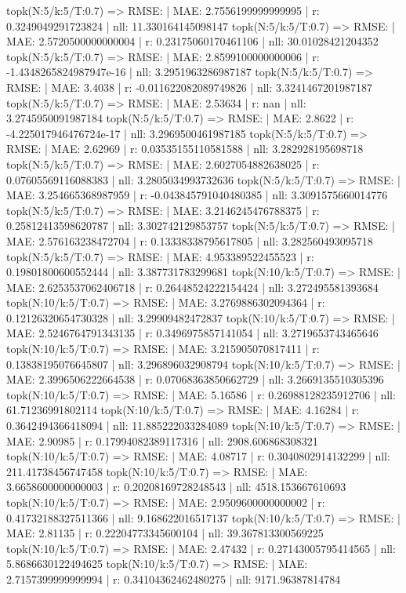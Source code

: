 topk(N:5/k:5/T:0.7) => RMSE: | MAE: 2.7556199999999995 | r: 0.3249049291723824 | nll: 11.330164145098147
topk(N:5/k:5/T:0.7) => RMSE: | MAE: 2.5720500000000004 | r: 0.23175060170461106 | nll: 30.01028421204352
topk(N:5/k:5/T:0.7) => RMSE: | MAE: 2.8599100000000006 | r: -1.4348265824987947e-16 | nll: 3.2951963286987187
topk(N:5/k:5/T:0.7) => RMSE: | MAE: 3.4038 | r: -0.011622082089749826 | nll: 3.3241467201987187
topk(N:5/k:5/T:0.7) => RMSE: | MAE: 2.53634 | r: nan | nll: 3.2745950091987184
topk(N:5/k:5/T:0.7) => RMSE: | MAE: 2.8622 | r: -4.225017946476724e-17 | nll: 3.2969500461987185
topk(N:5/k:5/T:0.7) => RMSE: | MAE: 2.62969 | r: 0.03535155110581588 | nll: 3.282928195698718
topk(N:5/k:5/T:0.7) => RMSE: | MAE: 2.6027054882638025 | r: 0.07605569116088383 | nll: 3.2805034993732636
topk(N:5/k:5/T:0.7) => RMSE: | MAE: 3.254665368987959 | r: -0.043845791040480385 | nll: 3.3091575660014776
topk(N:5/k:5/T:0.7) => RMSE: | MAE: 3.2146245476788375 | r: 0.25812413598620787 | nll: 3.302742129853757
topk(N:5/k:5/T:0.7) => RMSE: | MAE: 2.576163238472704 | r: 0.13338338795617805 | nll: 3.282560493095718
topk(N:5/k:5/T:0.7) => RMSE: | MAE: 4.953389522455523 | r: 0.19801800600552444 | nll: 3.387731783299681
topk(N:10/k:5/T:0.7) => RMSE: | MAE: 2.6253537062406718 | r: 0.26448524222154424 | nll: 3.272495581393684
topk(N:10/k:5/T:0.7) => RMSE: | MAE: 3.2769886302094364 | r: 0.12126320654730328 | nll: 3.29909482472837
topk(N:10/k:5/T:0.7) => RMSE: | MAE: 2.5246764791343135 | r: 0.3496975857141054 | nll: 3.2719653743465646
topk(N:10/k:5/T:0.7) => RMSE: | MAE: 3.215905070817411 | r: 0.13838195076645807 | nll: 3.296896032908794
topk(N:10/k:5/T:0.7) => RMSE: | MAE: 2.3996506222664538 | r: 0.07068363850662729 | nll: 3.2669135510305396
topk(N:10/k:5/T:0.7) => RMSE: | MAE: 5.16586 | r: 0.26988128235912706 | nll: 61.71236991802114
topk(N:10/k:5/T:0.7) => RMSE: | MAE: 4.16284 | r: 0.3642494366418094 | nll: 11.885222033284089
topk(N:10/k:5/T:0.7) => RMSE: | MAE: 2.90985 | r: 0.17994082389117316 | nll: 2908.606868308321
topk(N:10/k:5/T:0.7) => RMSE: | MAE: 4.08717 | r: 0.3040802914132299 | nll: 211.41738456747458
topk(N:10/k:5/T:0.7) => RMSE: | MAE: 3.6658600000000003 | r: 0.20208169728248543 | nll: 4518.153667610693
topk(N:10/k:5/T:0.7) => RMSE: | MAE: 2.9509600000000002 | r: 0.41732188327511366 | nll: 9.168622016517137
topk(N:10/k:5/T:0.7) => RMSE: | MAE: 2.81135 | r: 0.22204773345600104 | nll: 39.367813300569225
topk(N:10/k:5/T:0.7) => RMSE: | MAE: 2.47432 | r: 0.27143005795414565 | nll: 5.8686630122494625
topk(N:10/k:5/T:0.7) => RMSE: | MAE: 2.7157399999999994 | r: 0.34104362462480275 | nll: 9171.96387814784
